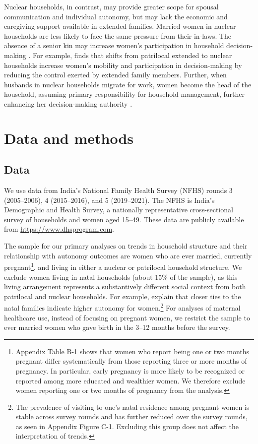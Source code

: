 \documentclass[10pt,twoside,reqno]{article}
\begin{document}
Nuclear households, in contrast, may provide greater scope for spousal communication and individual autonomy, but may lack the economic and caregiving support available in extended families. Married women in nuclear households are less likely to face the same pressure from their in-laws. The absence of a senior kin may increase women’s participation in household decision-making \citep{simkhada2010role,char2010influence}. For example, \cite{mookerjee2019gender} finds that shifts from patrilocal extended to nuclear households increase women’s mobility and participation in decision-making by reducing the control exerted by extended family members. Further, when husbands in nuclear households migrate for work, women become the head of the household, assuming primary responsibility for  household management, further enhancing her decision-making authority \citep{desai2008negotiated}. 

\section*{Data and methods}\label{sec:data_and_methods} %

\subsection*{Data} \label{sec:data}

We use data from India’s National Family Health Survey (NFHS) rounds 3 (2005–2006), 4 (2015–2016), and 5 (2019–2021). The NFHS is India’s Demographic and Health Survey, a nationally representative cross-sectional survey of households and women aged 15–49. These data are publicly available from \url{https://www.dhsprogram.com}.

The sample for our primary analyses on trends in household structure and their relationship with autonomy outcomes are women who are ever married, currently pregnant\footnote{Appendix Table B-1 shows that women who report being one or two months pregnant differ systematically from those reporting three or more months of pregnancy. In particular, early pregnancy is more likely to be recognized or reported among more educated and wealthier women. We therefore exclude women reporting one or two months of pregnancy from the analysis.}, and living in either a nuclear or patrilocal household structure. We exclude women living in natal households (about 15\% of the sample), as this living arrangement represents a substantively different social context from both patrilocal and nuclear households. For example, \cite{dyson1983kinship} explain that closer ties to the natal families indicate higher autonomy for women.\footnote{The prevalence of visiting to one's natal residence among pregnant women is stable across survey rounds and has further reduced over the survey rounds, as seen in Appendix Figure C-1.  Excluding this group does not affect the interpretation of trends.} For analyses of maternal healthcare use, instead of focusing on pregnant women, we restrict the sample to ever married women who gave birth in the 3--12 months before the survey.
\end{document}
